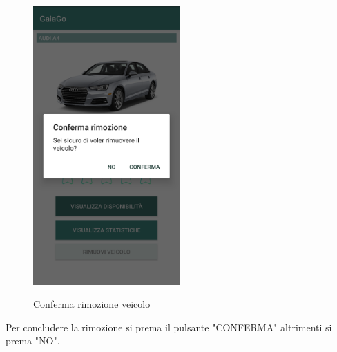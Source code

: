 \begin{figure}[H] 
	\centering 
	\includegraphics[width=0.5\textwidth]{res/images/rimozione_veicolo.png}\\
	\caption{Conferma rimozione veicolo}
	\label{rimozione1}
\end{figure}
Per concludere la rimozione si prema il pulsante "CONFERMA" altrimenti si prema "NO".
\pagebreak

